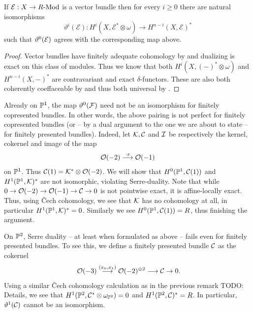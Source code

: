 \begin{proposition}
  If $\mathcal E : X \to R\text{-}\mathrm{Mod}$ is a vector bundle then for every $i\geq 0$ there are natural isomorphisms
  \[
    \vartheta^i(\mathcal E) : H^i(X, \mathcal E^\ast \otimes \omega) \to H^{n-i}(X,\mathcal E)^\ast
  \]
  such that $\vartheta^0(\mathcal{E})$ agrees with the corresponding map above.
\end{proposition}

\begin{proof}
  Vector bundles have finitely adequate cohomology by  and dualizing is exact on this class of modules.
  Thus we know that both $H^i(X, (-)^\ast \otimes \omega)$ and $H^{n-i}(X,-)^\ast$ are contravariant and exact $\delta$-functors.
    These are also both coherently coeffaceable by  and thus both universal by .
\end{proof}

\begin{remark}
  Already on $\mathbb{P}^1$, the map $\vartheta^0(\mathcal{F})$ need not be an isomorphism for finitely copresented bundles.
  In other words, the above pairing is not perfect for finitely copresented bundles (or -- by a dual argument to the one we are about to state -- for finitely presented bundles).
  Indeed, let $\mathcal{K}, \mathcal{C}$ and $\mathcal{I}$ be respectively the kernel, cokernel and image of the map
  \[
    \mathcal{O}(-2) \overset{\cdot x}{\longrightarrow} \mathcal{O}(-1)
  \]
  on $\mathbb{P}^1$.
  Thus $\mathcal{C}(1) = \mathcal{K}^\ast \otimes \mathcal{O}(-2)$.
  We will show that $H^0(\mathbb{P}^1,\mathcal{C}(1))$ and $H^1(\mathbb{P}^1,\mathcal{K})^\ast$ are not isomorphic, violating Serre-duality.
  Note that while $0 \to \mathcal{O}(-2) \to \mathcal{O}(-1) \to \mathcal{C} \to 0$ is not pointwise exact, it is affine-locally exact.
  Thus, using Čech cohomology, we see that $\mathcal{K}$ has no cohomology at all, in particular $H^1(\mathbb{P}^1,\mathcal{K})^\ast = 0$.
  Similarly we see $H^0(\mathbb{P}^1, \mathcal{C}(1))=R$, thus finishing the argument.
\end{remark}

\begin{remark}
  On $\mathbb{P}^2$, Serre duality -- at least when formulated as above -- fails even for finitely presented bundles.
  To see this, we define a finitely presented bundle $\mathcal{C}$ as the cokernel
  \[
    \mc O(-3) \overset{(x_0,x_1)}{\longrightarrow} \mc O(-2)^{\oplus 2} \longrightarrow \mc C \to 0 \rlap{.}
  \]
  Using a similar Čech cohomology calculation as in the previous remark {\color{red}TODO: Details}, we see that $H^1(\mathbb{P}^2,\mathcal{C}^\ast \otimes \omega_{\mathbb{P}^2}) = 0$ and $H^1(\mathbb{P}^2, \mathcal{C})^\ast = R$.
  In particular, $\vartheta^1(\mathcal{C})$ cannot be an isomorphism.
\end{remark}

